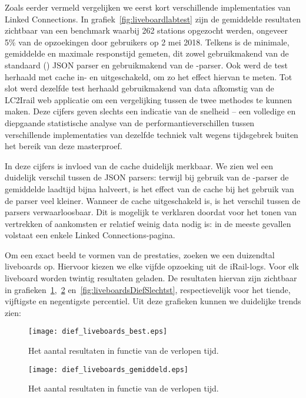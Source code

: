 Zoals eerder vermeld vergelijken we eerst kort verschillende implementaties van Linked Connections. In grafiek~\ref{fig:liveboardlabtest} zijn de gemiddelde resultaten zichtbaar van een benchmark waarbij 262 stations opgezocht werden, ongeveer 5\% van de opzoekingen door gebruikers op 2 mei 2018. Telkens is de minimale, gemiddelde en maximale responstijd gemeten, dit zowel gebruikmakend van de standaard () JSON parser en gebruikmakend van de -parser. Ook werd de test herhaald met cache in- en uitgeschakeld, om zo het effect hiervan te meten. Tot slot werd dezelfde test herhaald gebruikmakend van data afkomstig van de LC2Irail web applicatie om een vergelijking tussen de twee methodes te kunnen maken. Deze cijfers geven slechts een indicatie van de snelheid -- een volledige en diepgaande statistische analyse van de performantieverschillen tussen verschillende implementaties van dezelfde techniek valt wegens tijdsgebrek buiten het bereik van deze masterproef.

In deze cijfers is invloed van de cache duidelijk merkbaar. We zien wel een duidelijk verschil tussen de JSON parsers: terwijl bij gebruik van de -parser de gemiddelde laadtijd bijna halveert, is het effect van de cache bij het gebruik van de  parser veel kleiner. Wanneer de cache uitgeschakeld is, is het verschil tussen de parsers verwaarloosbaar. Dit is mogelijk te verklaren doordat voor het tonen van vertrekken of aankomsten er relatief weinig data nodig is: in de meeste gevallen volstaat een enkele Linked Connections-pagina.

Om een exact beeld te vormen van de prestaties, zoeken we een duizendtal liveboards op. Hiervoor kiezen we elke vijfde opzoeking uit de iRail-logs. Voor elk liveboard worden twintig resultaten geladen. De resultaten hiervan zijn zichtbaar in grafieken~\ref{fig:liveboardsDiefBest},~\ref{fig:liveboardsDiefAvg} en~\ref{fig:liveboardsDiefSlechtst}, respectievelijk voor het tiende, vijftigste en negentigste percentiel. Uit deze grafieken kunnen we duidelijke trends zien:

\begin{figure}[h]
	\centering
	\texttt{[image: dief\_liveboards\_best.eps]}
	\caption[Aantal resultaten liveboards in functie van de tijd (10e percentiel)]{Het aantal resultaten in functie van de verlopen tijd.}
	\label{fig:liveboardsDiefBest}
\end{figure}

\begin{figure}[h]
	\centering
	\texttt{[image: dief\_liveboards\_gemiddeld.eps]}
	\caption[Aantal resultaten liveboards in functie van de tijd (mediaan)]{Het aantal resultaten in functie van de verlopen tijd.}
	\label{fig:liveboardsDiefAvg}
\end{figure}

